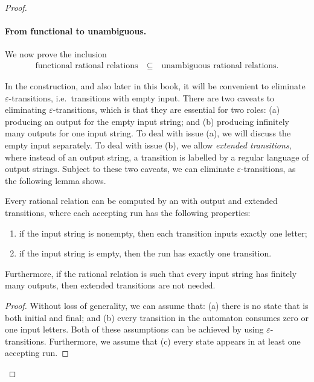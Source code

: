 \begin{proof}
    \paragraph*{From functional to unambiguous.}
    We now prove the  inclusion
    \begin{align*}
    \text{functional rational relations} \quad \subseteq \quad \text{unambiguous rational relations.}
    \end{align*}
    
            In the construction, and also later in this book,  it will be convenient to eliminate $\varepsilon$-transitions, i.e.~transitions with empty input. There are two caveats to eliminating $\varepsilon$-transitions, which is that they are  essential for two roles: (a) producing an output for the empty input string; and (b) producing infinitely many outputs for one input string.  To deal with issue (a), we will discuss the empty input separately. To deal with issue (b), we allow \emph{extended transitions}, where instead of an output string, a transition is labelled by a regular language of output strings. Subject to these two caveats, we can eliminate $\varepsilon$-transitions, as the following lemma shows.
        
        \begin{lemma}\label{lemma:eliminate-epsilon-transitions}
            Every rational relation can be computed by an \nfa with output and extended transitions, where each accepting run has the following properties:
            \begin{enumerate}
                \item if the input string is nonempty, then each transition inputs exactly one letter;
                \item if the input string is empty, then the run has exactly one transition.
            \end{enumerate}
            Furthermore, if the rational relation is such that every input string has finitely many outputs, then extended transitions are not needed.
        \end{lemma}
        \begin{proof}
        Without loss of generality, we can assume that: (a) there is no state that is both initial and final; and (b) every  transition in the automaton  consumes zero or one input letters. Both of these assumptions can be achieved by using $\varepsilon$-transitions. Furthermore, we assume that (c) every state appears in at least one accepting run. 
            

\end{proof}
\end{proof}
